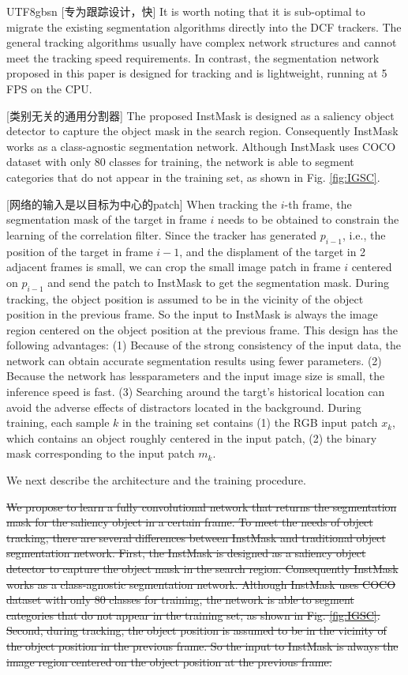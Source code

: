 \documentclass[review]{elsarticle}
\begin{document}
\begin{CJK*}{UTF8}{gbsn}
[专为跟踪设计，快] It is worth noting that it is sub-optimal to migrate the existing segmentation algorithms directly into the DCF trackers. The general tracking algorithms usually have complex network structures and cannot meet the tracking speed requirements. In contrast, the segmentation network proposed in this paper is designed for tracking and is lightweight, running at 5 FPS on the CPU.

[类别无关的通用分割器] The proposed InstMask is designed as a saliency object detector to capture the object mask in the search region. Consequently InstMask works as a class-agnostic segmentation network. Although InstMask uses COCO dataset \cite{Lin2014MicrosoftCC} with only 80 classes for training, the network is able to segment categories that do not appear in the training set, as shown in Fig. \ref{fig:IGSC}.

[网络的输入是以目标为中心的patch]
When tracking the $i$-th frame, the segmentation mask of the target in frame $i$ needs to be obtained to constrain the learning of the correlation filter. Since the tracker has generated $p_{i-1}$, i.e., the position of the target in frame $i-1$, and the displament of the target in 2 adjacent frames is small, we can crop the small image patch in frame $i$ centered on $p_{i-1}$ and send the patch to InstMask to get the segmentation mask.
During tracking, the object position is assumed to be in the vicinity of the object position in the previous frame. So the input to InstMask is always the image region centered on the object position at the previous frame.
This design has the following advantages: (1) Because of the strong consistency of the input data, the network can obtain accurate segmentation results using fewer parameters. (2) Because the network has lessparameters and the input image size is small, the inference speed is fast. (3) Searching around the targt's historical location can avoid the adverse effects of distractors located in the background. During training, each sample $k$ in the training set contains (1) the RGB input patch $x_k$, which contains an object roughly centered in the input patch, (2) the binary mask corresponding to the input patch $m_k$.

We next describe the architecture and the training procedure.

\sout{We propose to learn a fully convolutional network that returns the segmentation mask for the saliency object in a certain frame. To meet the needs of object tracking, there are several differences between InstMask and traditional object segmentation network. First, the InstMask is designed as a saliency object detector to capture the object mask in the search region. Consequently InstMask works as a class-agnostic segmentation network. Although InstMask uses COCO dataset \cite{Lin2014MicrosoftCC} with only 80 classes for training, the network is able to segment categories that do not appear in the training set, as shown in Fig. \ref{fig:IGSC}. Second, during tracking, the object position is assumed to be in the vicinity of the object position in the previous frame. So the input to InstMask is always the image region centered on the object position at the previous frame.}


\end{CJK*}
\end{document}
